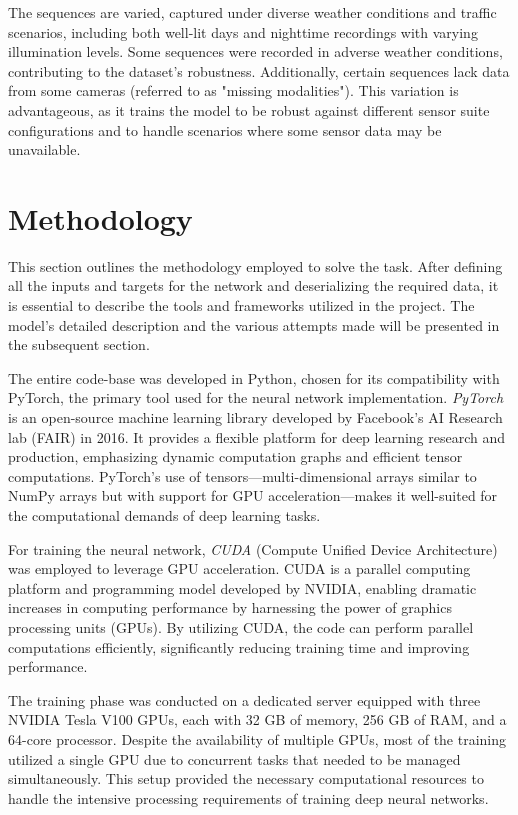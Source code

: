 The sequences are varied, captured under diverse weather conditions and traffic scenarios, including both well-lit days and nighttime recordings with varying illumination levels. Some sequences were recorded in adverse weather conditions, contributing to the dataset's robustness. Additionally, certain sequences lack data from some cameras (referred to as "missing modalities"). This variation is advantageous, as it trains the model to be robust against different sensor suite configurations and to handle scenarios where some sensor data may be unavailable.

\section{Methodology}

This section outlines the methodology employed to solve the task. After defining all the inputs and targets for the network and deserializing the required data, it is essential to describe the tools and frameworks utilized in the project. The model's detailed description and the various attempts made will be presented in the subsequent section.

The entire code-base was developed in Python, chosen for its compatibility with PyTorch, the primary tool used for the neural network implementation. \textit{PyTorch} is an open-source machine learning library developed by Facebook's AI Research lab (FAIR) in 2016. It provides a flexible platform for deep learning research and production, emphasizing dynamic computation graphs and efficient tensor computations. PyTorch's use of tensors—multi-dimensional arrays similar to NumPy arrays but with support for GPU acceleration—makes it well-suited for the computational demands of deep learning tasks.

For training the neural network, \textit{CUDA} (Compute Unified Device Architecture) was employed to leverage GPU acceleration. CUDA is a parallel computing platform and programming model developed by NVIDIA, enabling dramatic increases in computing performance by harnessing the power of graphics processing units (GPUs). By utilizing CUDA, the code can perform parallel computations efficiently, significantly reducing training time and improving performance.

The training phase was conducted on a dedicated server equipped with three NVIDIA Tesla V100 GPUs, each with 32 GB of memory, 256 GB of RAM, and a 64-core processor. Despite the availability of multiple GPUs, most of the training utilized a single GPU due to concurrent tasks that needed to be managed simultaneously. This setup provided the necessary computational resources to handle the intensive processing requirements of training deep neural networks.

